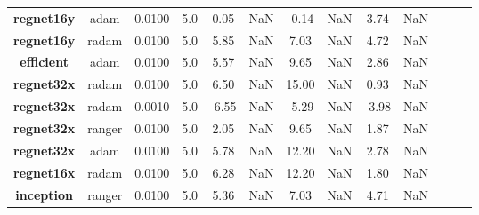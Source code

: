 \begin{table}
\begin{tabular}{c|c|c|c|c|c|c|c|c|c|c|c|c|}
\textbf{regnet16y} &    adam &  0.0100 &         5.0 &                     0.05 &                     NaN &                   -0.14 &                    NaN &                    3.74 &                     NaN \\
\textbf{regnet16y} &   radam &  0.0100 &         5.0 &                     5.85 &                     NaN &                    7.03 &                    NaN &                    4.72 &                     NaN \\
\textbf{efficient} &    adam &  0.0100 &         5.0 &                     5.57 &                     NaN &                    9.65 &                    NaN &                    2.86 &                     NaN \\
\textbf{regnet32x} &   radam &  0.0100 &         5.0 &                     6.50 &                     NaN &                   15.00 &                    NaN &                    0.93 &                     NaN \\
\textbf{regnet32x} &   radam &  0.0010 &         5.0 &                    -6.55 &                     NaN &                   -5.29 &                    NaN &                   -3.98 &                     NaN \\
\textbf{regnet32x} &  ranger &  0.0100 &         5.0 &                     2.05 &                     NaN &                    9.65 &                    NaN &                    1.87 &                     NaN \\
\textbf{regnet32x} &    adam &  0.0100 &         5.0 &                     5.78 &                     NaN &                   12.20 &                    NaN &                    2.78 &                     NaN \\
\textbf{regnet16x} &   radam &  0.0100 &         5.0 &                     6.28 &                     NaN &                   12.20 &                    NaN &                    1.80 &                     NaN \\
\textbf{inception} &  ranger &  0.0100 &         5.0 &                     5.36 &                     NaN &                    7.03 &                    NaN &                    4.71 &                     NaN \\
\bottomrule
\end{tabular}
\end{table}
